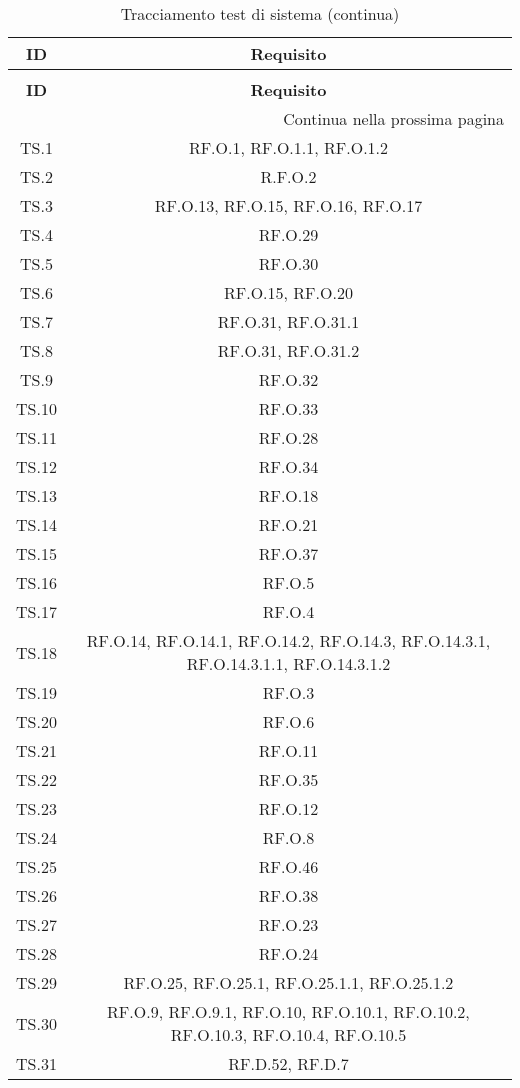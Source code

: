 \bgroup
\begin{adjustwidth}{-0.5cm}{-0.5cm}
	\centering
  \begin{longtable}{|c|c|}
		\caption{Tracciamento test di sistema}
  	\label{tab:tracciamento-test-sistema} \\
    \hline
		\textbf{ID} & \textbf{Requisito} \\ 
		\hline
		\endfirsthead

		\caption[]{Tracciamento test di sistema (continua)} \\
		\hline
		\textbf{ID} & \textbf{Requisito} \\ 
		\hline
		\endhead

		\hline
		\multicolumn{2}{|r|}{{Continua nella prossima pagina}} \\ 
		\hline
		\endfoot

		\hline
		\endlastfoot

    TS.1 & RF.O.1, RF.O.1.1, RF.O.1.2\\
		\hline TS.2 & R.F.O.2\\
		\hline TS.3 & RF.O.13, RF.O.15, RF.O.16, RF.O.17\\
		\hline TS.4 & RF.O.29\\
		\hline TS.5 & RF.O.30\\
		\hline TS.6 & RF.O.15, RF.O.20\\
		\hline TS.7 & RF.O.31, RF.O.31.1\\
		\hline TS.8 & RF.O.31, RF.O.31.2\\
		\hline TS.9 & RF.O.32\\
		\hline TS.10 & RF.O.33\\
		\hline TS.11 & RF.O.28\\
		\hline TS.12 & RF.O.34\\
		\hline TS.13 & RF.O.18\\
		\hline TS.14 & RF.O.21\\
		\hline TS.15 & RF.O.37\\
		\hline TS.16 & RF.O.5\\
		\hline TS.17 & RF.O.4\\
		\hline TS.18 & RF.O.14, RF.O.14.1, RF.O.14.2, RF.O.14.3, RF.O.14.3.1, RF.O.14.3.1.1, RF.O.14.3.1.2\\
		\hline TS.19 & RF.O.3\\
		\hline TS.20 & RF.O.6\\
		\hline TS.21 & RF.O.11\\
		\hline TS.22 & RF.O.35\\
		\hline TS.23 & RF.O.12\\
		\hline TS.24 & RF.O.8\\
		\hline TS.25 & RF.O.46\\
		\hline TS.26 & RF.O.38\\
		\hline TS.27 & RF.O.23\\
		\hline TS.28 & RF.O.24\\
		\hline TS.29 & RF.O.25, RF.O.25.1, RF.O.25.1.1, RF.O.25.1.2\\
		\hline TS.30 & RF.O.9, RF.O.9.1, RF.O.10, RF.O.10.1, RF.O.10.2, RF.O.10.3, RF.O.10.4, RF.O.10.5\\
		\hline TS.31 & RF.D.52, RF.D.7\\
  \end{longtable}
\end{adjustwidth}
\egroup